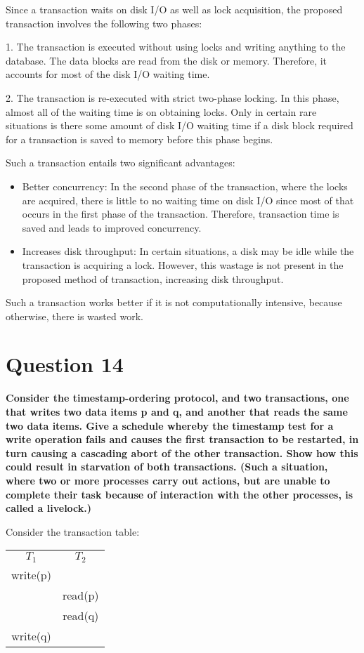 \documentclass[12pt]{article}
\begin{document}
Since a transaction waits on disk I/O as well as lock acquisition, the proposed transaction involves the following two phases:

1. The transaction is executed without using locks and writing anything to the database. The data blocks are read from the disk or memory. Therefore, it accounts for most of the disk I/O waiting time.

2. The transaction is re-executed with strict two-phase locking. In this phase, almost all of the waiting time is on obtaining locks. Only in certain rare situations is there some amount of disk I/O waiting time if a disk block required for a transaction is saved to memory before this phase begins.

Such a transaction entails two significant advantages:
\begin{itemize}
    \item Better concurrency: In the second phase of the transaction, where the locks are acquired, there is little to no waiting time on disk I/O since most of that occurs in the first phase of the transaction. Therefore, transaction time is saved and leads to improved concurrency.
    \item Increases disk throughput:  In certain situations, a disk may be idle while the transaction is acquiring a lock. However, this wastage is not present in the proposed method of transaction, increasing disk throughput.
\end{itemize}

Such a transaction works better if it is not computationally intensive, because otherwise, there is wasted work.
\section*{Question 14}
{\bfseries Consider the timestamp-ordering protocol, and two transactions, one that writes two data items p and q, and another that reads the same two data items. Give a schedule whereby the timestamp test for a write operation fails and causes the first transaction to be restarted, in turn causing a cascading abort
of the other transaction. Show how this could result in starvation of both transactions. (Such a situation, where two or more processes carry out actions, but are unable to complete their task because of interaction with the other processes, is called a livelock.)}

Consider the transaction table:

\begin{center}
\begin{tabular}{ c c }
 $T_1$ & $T_2$ \\ 
 write(p) &  \\  
  & read(p) \\
  & read(q) \\
 write(q) & 
\end{tabular}
\end{center}
\end{document}
